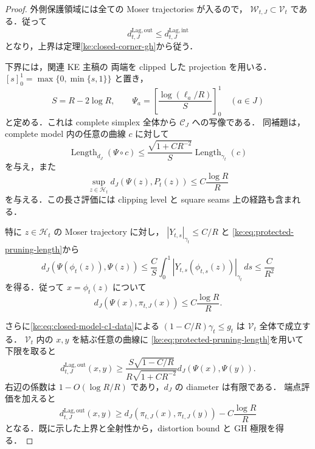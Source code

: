 \begin{proof}
外側保護領域には全ての Moser trajectories が入るので，
$\mathcal W_{t,J}\subset\mathcal V_t$ である．従って
\[
 d_{t,J}^{\mathrm{Lag,out}}\le d_{t,J}^{\mathrm{Lag,int}}
\]
となり，上界は定理\ref{ke:closed-corner-gh}から従う．

下界には，関連 KE 主稿\cite[Part~IV,
\texttt{simplex:lem:closed-corner-no-shortcut}]{KELocalCurrent}の
両端を clipped した projection を用いる．
$[s]_0^1=\max\{0,\min\{s,1\}\}$ と置き，
\[
 S=R-2\log R,\qquad
 \Psi_a=\left[\frac{\log(\ell_a/R)}S\right]_0^1
 \quad(a\in J)
\]
と定める．これは complete simplex 全体から $\mathcal C_J$ への写像である．
同補題は，complete model 内の任意の曲線 $c$ に対して
\begin{equation}\label{ke:eq:protected-pruning-length}
 \operatorname{Length}_{d_J}(\Psi\circ c)
 \le\frac{\sqrt{1+CR^{-2}}}{S}\operatorname{Length}_{\gamma_t}(c)
\end{equation}
を与え，また
\begin{equation}\label{ke:eq:protected-pruning-endpoints}
 \sup_{z\in\mathcal H_t}d_J(\Psi(z),P_t(z))
 \le C\frac{\log R}{R}
\end{equation}
を与える．この長さ評価には clipping level と square seams 上の経路も含まれる．

特に $z\in\mathcal H_t$ の Moser trajectory に対し，
$|Y_{t,s}|_{\gamma_t}\le C/R$ と
\eqref{ke:eq:protected-pruning-length}から
\begin{equation}\label{ke:eq:protected-moser-endpoint}
 d_J(\Psi(\phi_t(z)),\Psi(z))
 \le\frac{C}{S}\int_0^1|Y_{t,s}(\phi_{t,s}(z))|_{\gamma_t}\,ds
 \le\frac{C}{R^2}
\end{equation}
を得る．従って $x=\phi_t(z)$ について
\[
 d_J(\Psi(x),\pi_{t,J}(x))\le C\frac{\log R}{R}.
\]

さらに\eqref{ke:eq:closed-model-c1-data}による
$(1-C/R)\gamma_t\le g_t$ は $\mathcal V_t$ 全体で成立する．
$\mathcal V_t$ 内の $x,y$ を結ぶ任意の曲線に
\eqref{ke:eq:protected-pruning-length}を用いて下限を取ると
\[
 d_{t,J}^{\mathrm{Lag,out}}(x,y)
 \ge \frac{S\sqrt{1-C/R}}{R\sqrt{1+CR^{-2}}}
          d_J(\Psi(x),\Psi(y)).
\]
右辺の係数は $1-O(\log R/R)$ であり，$d_J$ の diameter は有限である．
端点評価を加えると
\[
 d_{t,J}^{\mathrm{Lag,out}}(x,y)
 \ge d_J(\pi_{t,J}(x),\pi_{t,J}(y))-C\frac{\log R}{R}
\]
となる．既に示した上界と全射性から，distortion bound と GH 極限を得る．
\end{proof}

